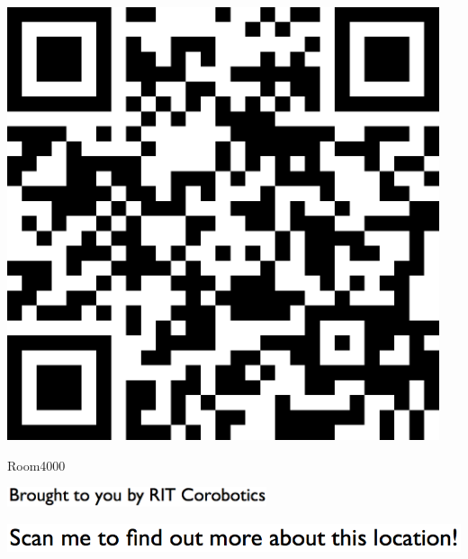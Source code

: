 \documentclass[letterpaper]{article}
\begin{document}
 \begingroup 
 \centerline{\includegraphics[scale=1,width=5in,height=5in]{Room4000.png}} 
 \endgroup 
 \vspace*{\fill} 

 \hfill{\small Room4000} 

  \vspace{0.7in} 
 
 \centerline{\includegraphics[scale=1,width=3in]{text-bottom.png}} 
 
 \pagebreak 
{} 
 \vspace*{\fill} 
 
  \centerline{\includegraphics[scale=1,width=6in]{text-top.png}} 
 
 \vspace{0.5in} 
 
\end{document}
